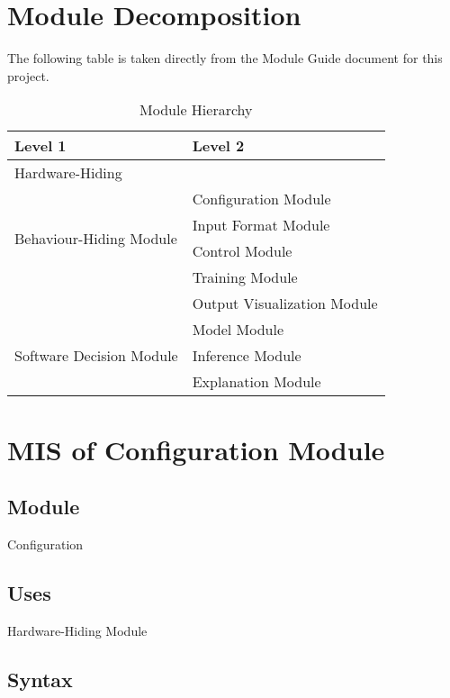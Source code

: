 \documentclass[12pt, titlepage]{article}
\begin{document}
\section{Module Decomposition}

The following table is taken directly from the Module Guide document for this project.

\begin{table}[h!]
\centering
\begin{tabular}{p{} p{}}
\toprule
\textbf{Level 1} & \textbf{Level 2}\\
\midrule

{Hardware-Hiding} & ~ \\
\midrule

\multirow{4}{0.3\textwidth}{Behaviour-Hiding Module} & Configuration Module \\
& Input Format Module\\
& Control Module\\
& Training Module\\
& Output Visualization Module\\
\midrule

\multirow{3}{0.3\textwidth}{Software Decision Module} & {Model Module}\\
& Inference Module\\
& Explanation Module\\
\bottomrule

\end{tabular}
\caption{Module Hierarchy}
\label{TblMH}
\end{table}



\section{MIS of Configuration Module} \label{Configurations}

\subsection{Module}
Configuration

\subsection{Uses}
Hardware-Hiding Module

\subsection{Syntax}
\end{document}
